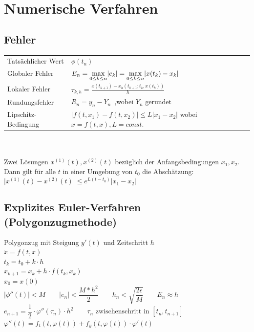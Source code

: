 \section{Numerische Verfahren}

\subsection{Fehler}

\begin{tabular}{ll}
Tatsächlicher Wert \quad  & $\phi(t_n)$ \\
Globaler Fehler & $E_n = \smash{\displaystyle\max_{0 \leq k \leq n}} \lvert e_k \rvert = \smash{\displaystyle\max_{0 \leq k \leq n}}\lvert x(t_k) - x_k\rvert$ \\ \\
Lokaler Fehler & $\tau_{k,h} = \frac{x(t_{k+1}) - x_h(t_{k+1}; t_k, x(t_k))}{h}$ \\
Rundungsfehler & $R_n = y_n - Y_n$\, ,\quad wobei $Y_n$ gerundet \\
Lipschitz-Bedingung & $\lvert f(t, x_1) - f(t, x_2)\rvert \leq L \lvert x_1 - x_2 \rvert$ wobei $\dot{x} = f(t,x), L = const.$ \\
\end{tabular}\\ \\
Zwei Lösungen $x^{(1)}(t), x^{(2)}(t)$ bezüglich der Anfangsbedingungen $x_1, x_2$. Dann gilt für alle $t$ in einer Umgebung von $t_0$ die Abschätzung: $\lvert x^{(1)}(t) - x^{(2)}(t)\rvert \leq e^{L(t-t_0)} \lvert x_1 - x_2\rvert $ \newline

\begin{minipage}{0.6\linewidth}
    \subsection{Explizites Euler-Verfahren (Polygonzugmethode)}
    Polygonzug mit Steigung $y'(t)$ und Zeitschritt $h$\\
    $\dot{x} = f(t,x)$ \\
    $t_k = t_0 + k \cdot h$ \\
    $x_{k+1} = x_k + h \cdot f(t_k, x_k)$ \\
    $x_0 = x(0)$ \\
    $|\phi''(t)|<M \qquad |e_n| < \dfrac{M*h^2}{2} \qquad
    h_n < \sqrt{\dfrac{2\epsilon}{M}} \qquad E_n \approx h$\\
    $e_{n+1} = \dfrac{1}{2} \cdot \varphi''(\tau_n)\cdot h^2 \qquad \tau_n \text{ zwischenschritt in } [t_n,t_{n+1}]$\\
    $\varphi''(t)=f_t(t,\varphi(t)) + f_y(t,\varphi(t))\cdot\varphi'(t)$\\\\
\end{minipage}
\begin{minipage}{0.4\linewidth}
    
\end{minipage} 

